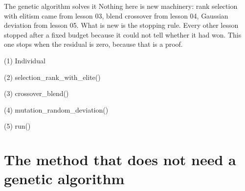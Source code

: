 \begin{frame}{The genetic algorithm solves it}
Nothing here is new machinery: rank selection with elitism came from lesson 03,
blend crossover from lesson 04, Gaussian deviation from lesson 05. What is new
is the stopping rule. Every other lesson stopped after a fixed budget because it
could not tell whether it had won. This one stops when the residual is zero,
because that is a proof.
\end{frame}

\begin{frame}[fragile]{(1) Individual}

\end{frame}

\begin{frame}[fragile]{(2) selection\_rank\_with\_elite()}

\end{frame}

\begin{frame}[fragile]{(3) crossover\_blend()}

\end{frame}

\begin{frame}[fragile]{(4) mutation\_random\_deviation()}

\end{frame}

\begin{frame}[fragile]{(5) run()}

\end{frame}


\section{The method that does not need a genetic algorithm}

